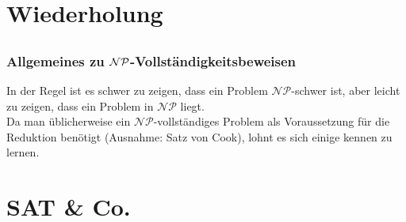 

\section{Wiederholung}
\subsection{}

\begin{frame}
\frametitle{Allgemeines zu $\mathcal{NP}$-Vollständigkeitsbeweisen}
In der Regel ist es schwer zu zeigen, dass ein Problem $\mathcal{NP}$-schwer ist, aber leicht zu zeigen, dass ein Problem in $\mathcal{NP}$ liegt.\\[8pt]
Da man üblicherweise ein $\mathcal{NP}$-vollständiges Problem als Voraussetzung für die Reduktion benötigt (Ausnahme: Satz von Cook), lohnt es sich einige kennen zu lernen.
\end{frame}

\section{SAT \& Co.}
\subsection{}

